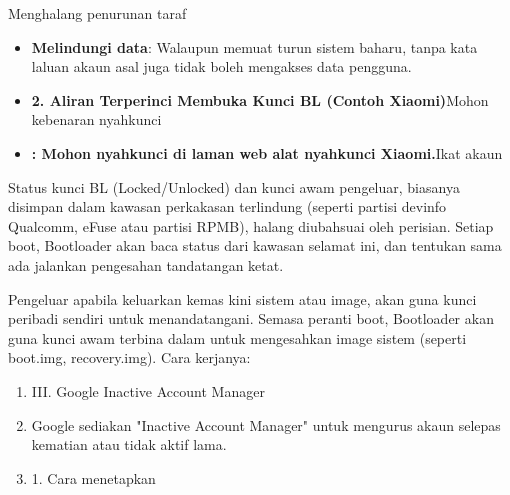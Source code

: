 


Menghalang penurunan taraf


\begin{itemize}
  \item \textbf{Melindungi data}: Walaupun memuat turun sistem baharu, tanpa kata laluan akaun asal juga tidak boleh mengakses data pengguna.
  \item \textbf{2. Aliran Terperinci Membuka Kunci BL (Contoh Xiaomi)}Mohon kebenaran nyahkunci
  \item \textbf{: Mohon nyahkunci di laman web alat nyahkunci Xiaomi.}Ikat akaun
\end{itemize}


Status kunci BL (Locked/Unlocked) dan kunci awam pengeluar, biasanya disimpan dalam kawasan perkakasan terlindung (seperti partisi devinfo Qualcomm, eFuse atau partisi RPMB), halang diubahsuai oleh perisian. Setiap boot, Bootloader akan baca status dari kawasan selamat ini, dan tentukan sama ada jalankan pengesahan tandatangan ketat.


Pengeluar apabila keluarkan kemas kini sistem atau image, akan guna kunci peribadi sendiri untuk menandatangani. Semasa peranti boot, Bootloader akan guna kunci awam terbina dalam untuk mengesahkan image sistem (seperti boot.img, recovery.img). Cara kerjanya:

\begin{enumerate}
  \item III. Google Inactive Account Manager
  \item Google sediakan "Inactive Account Manager" untuk mengurus akaun selepas kematian atau tidak aktif lama.
  \item 1. Cara menetapkan
\end{enumerate}

